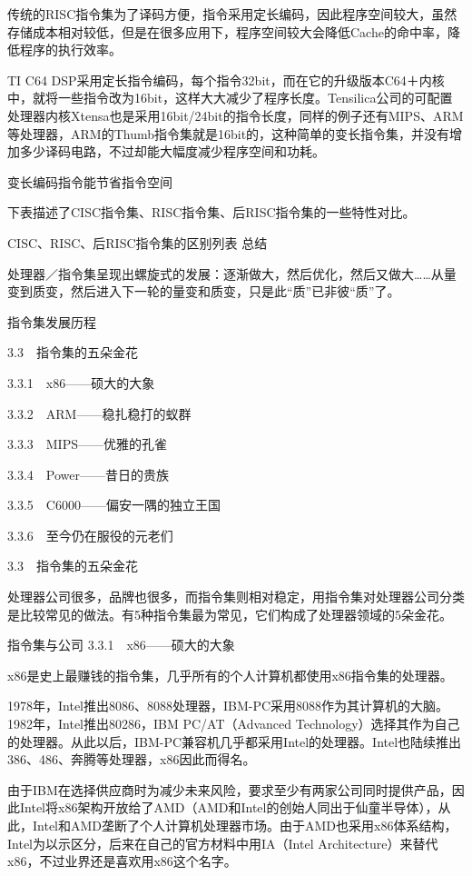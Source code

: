 \documentclass[12pt,UTF8]{ctexbook}
\begin{document}
传统的RISC指令集为了译码方便，指令采用定长编码，因此程序空间较大，虽然存储成本相对较低，但是在很多应用下，程序空间较大会降低Cache的命中率，降低程序的执行效率。

TI C64 DSP采用定长指令编码，每个指令32bit，而在它的升级版本C64＋内核中，就将一些指令改为16bit，这样大大减少了程序长度。Tensilica公司的可配置处理器内核Xtensa也是采用16bit/24bit的指令长度，同样的例子还有MIPS、ARM等处理器，ARM的Thumb指令集就是16bit的，这种简单的变长指令集，并没有增加多少译码电路，不过却能大幅度减少程序空间和功耗。

变长编码指令能节省指令空间

下表描述了CISC指令集、RISC指令集、后RISC指令集的一些特性对比。

CISC、RISC、后RISC指令集的区别列表
总结

处理器／指令集呈现出螺旋式的发展：逐渐做大，然后优化，然后又做大……从量变到质变，然后进入下一轮的量变和质变，只是此“质”已非彼“质”了。

指令集发展历程



3.3　指令集的五朵金花

3.3.1　x86——硕大的大象

3.3.2　ARM——稳扎稳打的蚁群

3.3.3　MIPS——优雅的孔雀

3.3.4　Power——昔日的贵族

3.3.5　C6000——偏安一隅的独立王国

3.3.6　至今仍在服役的元老们


3.3　指令集的五朵金花

处理器公司很多，品牌也很多，而指令集则相对稳定，用指令集对处理器公司分类是比较常见的做法。有5种指令集最为常见，它们构成了处理器领域的5朵金花。

指令集与公司
3.3.1　x86——硕大的大象

x86是史上最赚钱的指令集，几乎所有的个人计算机都使用x86指令集的处理器。

1978年，Intel推出8086、8088处理器，IBM-PC采用8088作为其计算机的大脑。1982年，Intel推出80286，IBM PC/AT（Advanced Technology）选择其作为自己的处理器。从此以后，IBM-PC兼容机几乎都采用Intel的处理器。Intel也陆续推出386、486、奔腾等处理器，x86因此而得名。

由于IBM在选择供应商时为减少未来风险，要求至少有两家公司同时提供产品，因此Intel将x86架构开放给了AMD（AMD和Intel的创始人同出于仙童半导体），从此，Intel和AMD垄断了个人计算机处理器市场。由于AMD也采用x86体系结构，Intel为以示区分，后来在自己的官方材料中用IA（Intel Architecture）来替代x86，不过业界还是喜欢用x86这个名字。
\end{document}
